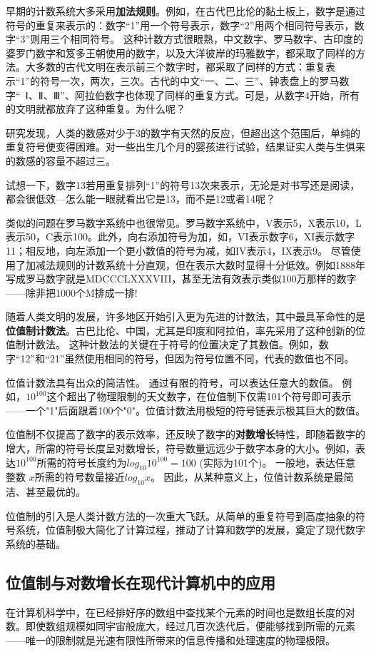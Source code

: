 早期的计数系统大多采用{\bf 加法规则}。例如，在古代巴比伦的黏土板上，数字是通过符号的重复来表示的：数字“1”用一个符号表示，数字“2”用两个相同符号表示，数字“3”则用三个相同符号。
这种计数方式很眼熟，中文数字、罗马数字、古印度的婆罗门数字和笈多王朝使用的数字，以及大洋彼岸的玛雅数字，都采取了同样的方法。大多数的古代文明在表示前三个数字时，都采取了同样的方式：重复表示“1”的符号一次，两次，三次。古代的中文“一、二、三”、钟表盘上的罗马数字“~Ⅰ、Ⅱ、Ⅲ”、阿拉伯数字也体现了同样的重复方式。可是，从数字4开始，所有的文明就都放弃了这种重复。为什么呢？

研究发现，人类的数感对少于3的数字有天然的反应，但超出这个范围后，单纯的重复符号便变得困难。对一些出生几个月的婴孩进行试验，结果证实人类与生俱来的数感的容量不超过三。

试想一下，数字13若用重复排列“1”的符号13次来表示，无论是对书写还是阅读，都会很低效---怎么能一眼就看出它是13，而不是12或者14呢？

类似的问题在罗马数字系统中也很常见。罗马数字系统中，V表示5，X表示10，L表示50，C表示100。此外，向右添加符号为加，如，VI表示数字6，XI表示数字11；相反地，向左添加一个更小数值的符号为减，如IV表示4，IX表示9。
尽管使用了加减法规则的计数系统十分直观，但在表示大数时显得十分低效。例如1888年写成罗马数字就是MDCCCLXXXVIII，甚至无法有效表示类似100万那样的数字——除非把1000个M排成一排!

随着人类文明的发展，许多地区开始引入更为先进的计数法，其中最具革命性的是{\bf 位值制计数法}。古巴比伦、中国，尤其是印度和阿拉伯，率先采用了这种创新的位值制计数法。
这种计数法的关键在于符号的位置决定了其数值。例如，数字“12”和“21”虽然使用相同的符号，但因为符号位置不同，代表的数值也不同。

位值计数法具有出众的简洁性。
通过有限的符号，可以表达任意大的数值。
例如，$10^{100}$这个超出了物理限制的天文数字，在位值制下仅需101个符号即可表示——一个"1"后面跟着100个"0"。位值计数法用极短的符号链表示极其巨大的数值。

位值制不仅提高了数字的表示效率，还反映了数字的{\bf 对数增长}特性，即随着数字的增大，所需的符号长度呈对数增长，符号数量远远少于数字本身的大小。例如，表达$10^{100}$所需的符号长度约为$log_10 10^{100}=100$ (实际为101个)。
一般地，表达任意整数 $x$所需的符号数量接近$log_{10} x$。
因此，从某种意义上，位值计数系统是最简洁、甚至最优的。

位值制的引入是人类计数方法的一次重大飞跃。从简单的重复符号到高度抽象的符号系统，位值制极大简化了计算过程，推动了计算和数学的发展，奠定了现代数字系统的基础。

\subsection{位值制与对数增长在现代计算机中的应用}
在计算机科学中，在已经排好序的数组中查找某个元素的时间也是数组长度的对数。即使数组规模如同宇宙般庞大，经过几百次迭代后，便能够找到所需的元素——唯一的限制就是光速有限性所带来的信息传播和处理速度的物理极限。

